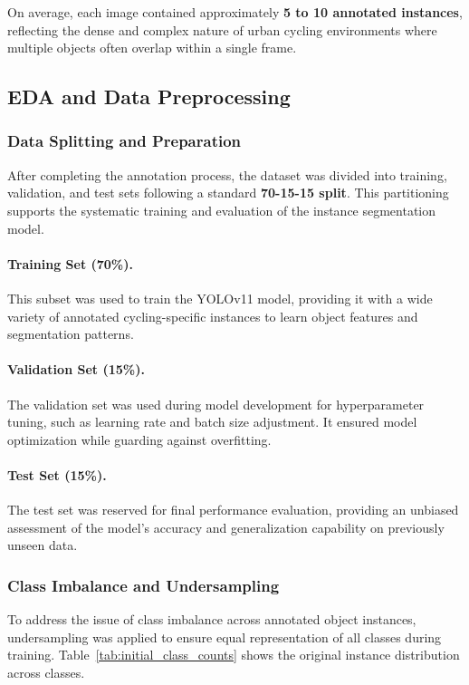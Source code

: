 On average, each image contained approximately \textbf{5 to 10 annotated instances}, reflecting the dense and complex nature of urban cycling environments where multiple objects often overlap within a single frame.


\subsection{EDA and Data Preprocessing}

\subsubsection{Data Splitting and Preparation}

After completing the annotation process, the dataset was divided into training, validation, and test sets following a standard \textbf{70-15-15 split}. This partitioning supports the systematic training and evaluation of the instance segmentation model.

\paragraph{Training Set (70\%).} This subset was used to train the YOLOv11 model, providing it with a wide variety of annotated cycling-specific instances to learn object features and segmentation patterns.

\paragraph{Validation Set (15\%).} The validation set was used during model development for hyperparameter tuning, such as learning rate and batch size adjustment. It ensured model optimization while guarding against overfitting.

\paragraph{Test Set (15\%).} The test set was reserved for final performance evaluation, providing an unbiased assessment of the model's accuracy and generalization capability on previously unseen data.

\subsubsection{Class Imbalance and Undersampling}

To address the issue of class imbalance across annotated object instances, undersampling was applied to ensure equal representation of all classes during training. Table~\ref{tab:initial_class_counts} shows the original instance distribution across classes.

